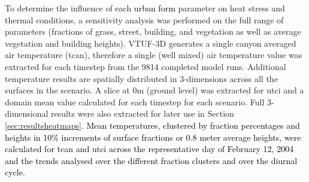 \documentclass[final,3p,times,authoryear]{elsarticle}
\newcommand{\add}[1]{\textcolor{black}{#1}}
\newcommand{\remove}[1]{\textcolor{red}{\st{}}}
\begin{document}
To determine the influence of each \add{urban form} parameter on heat stress and\remove{urban} thermal conditions, a sensitivity analysis was performed on the full range of parameters (fractions of grass, street, building, and vegetation as well as average vegetation and building heights). VTUF-3D generates a single canyon averaged air temperature (\gls{tcan}), therefore a single (well mixed) air temperature value was extracted for each timestep from the 9814 completed model runs. Additional temperature results are spatially distributed in 3-dimensions across all the surfaces in the scenario. A slice at 0m (ground level) was extracted for \gls{utci} and a domain mean value calculated for each timestep for each scenario. Full 3-dimensional results were also extracted for later use in Section \ref{sec:resultsheatmaps}. \add{Mean temperatures, clustered by fraction percentages and heights in 10\% increments of surface fractions or 0.8 meter average heights, were calculated for \gls{tcan} and \gls{utci} across the representative day of February 12, 2004 and the trends analysed over the different fraction clusters and over the diurnal cycle. }



\end{document}
